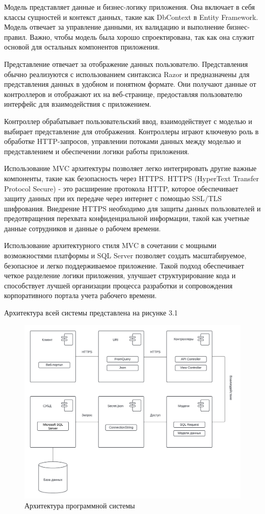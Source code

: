 Модель представляет данные и бизнес-логику приложения. Она включает в себя классы сущностей и контекст данных, такие как DbContext в Entity Framework. Модель отвечает за управление данными, их валидацию и выполнение бизнес-правил. Важно, чтобы модель была хорошо спроектирована, так как она служит основой для остальных компонентов приложения.

Представление отвечает за отображение данных пользователю. Представления обычно реализуются с использованием синтаксиса Razor и предназначены для представления данных в удобном и понятном формате. Они получают данные от контроллеров и отображают их на веб-странице, предоставляя пользователю интерфейс для взаимодействия с приложением.

Контроллер обрабатывает пользовательский ввод, взаимодействует с моделью и выбирает представление для отображения. Контроллеры играют ключевую роль в обработке HTTP-запросов, управлении потоками данных между моделью и представлением и обеспечении логики работы приложения.

Использование MVC архитектуры позволяет легко интегрировать другие важные компоненты, такие как безопасность через HTTPS. HTTPS (HyperText Transfer Protocol Secure) - это расширение протокола HTTP, которое обеспечивает защиту данных при их передаче через интернет с помощью SSL/TLS шифрования. Внедрение HTTPS необходимо для защиты данных пользователей и предотвращения перехвата конфиденциальной информации, такой как учетные данные сотрудников и данные о рабочем времени.

Использование архитектурного стиля MVC в сочетании с мощными возможностями платформы и SQL Server позволяет создать масштабируемое, безопасное и легко поддерживаемое приложение. Такой подход обеспечивает четкое разделение логики приложения, улучшает структурирование кода и способствует лучшей организации процесса разработки и сопровождения корпоративного портала учета рабочего времени.

Архитектура всей системы представлена на рисунке 3.1

\begin{figure}[H]
	\centering
	\includegraphics[width=0.9\linewidth]{"images/Архитектура программы"}
	\caption{Архитектура программной системы}
	\label{fig:-}
\end{figure}

